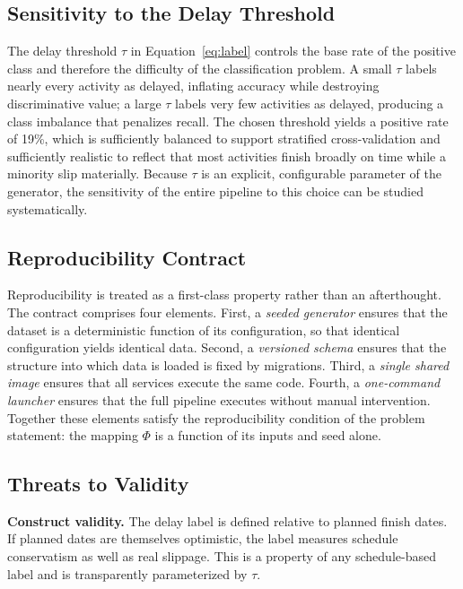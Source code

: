 \documentclass[conference]{IEEEtran}
\begin{document}
\subsection{Sensitivity to the Delay Threshold}

The delay threshold $\tau$ in Equation~\eqref{eq:label} controls the base rate of the positive class and therefore the difficulty of the classification problem. A small $\tau$ labels nearly every activity as delayed, inflating accuracy while destroying discriminative value; a large $\tau$ labels very few activities as delayed, producing a class imbalance that penalizes recall. The chosen threshold yields a positive rate of 19\%, which is sufficiently balanced to support stratified cross-validation and sufficiently realistic to reflect that most activities finish broadly on time while a minority slip materially. Because $\tau$ is an explicit, configurable parameter of the generator, the sensitivity of the entire pipeline to this choice can be studied systematically.

\subsection{Reproducibility Contract}

Reproducibility is treated as a first-class property rather than an afterthought. The contract comprises four elements. First, a \emph{seeded generator} ensures that the dataset is a deterministic function of its configuration, so that identical configuration yields identical data. Second, a \emph{versioned schema} ensures that the structure into which data is loaded is fixed by migrations. Third, a \emph{single shared image} ensures that all services execute the same code. Fourth, a \emph{one-command launcher} ensures that the full pipeline executes without manual intervention. Together these elements satisfy the reproducibility condition of the problem statement: the mapping $\Phi$ is a function of its inputs and seed alone.

\subsection{Threats to Validity}

\textbf{Construct validity.} The delay label is defined relative to planned finish dates. If planned dates are themselves optimistic, the label measures schedule conservatism as well as real slippage. This is a property of any schedule-based label and is transparently parameterized by $\tau$.
\end{document}
